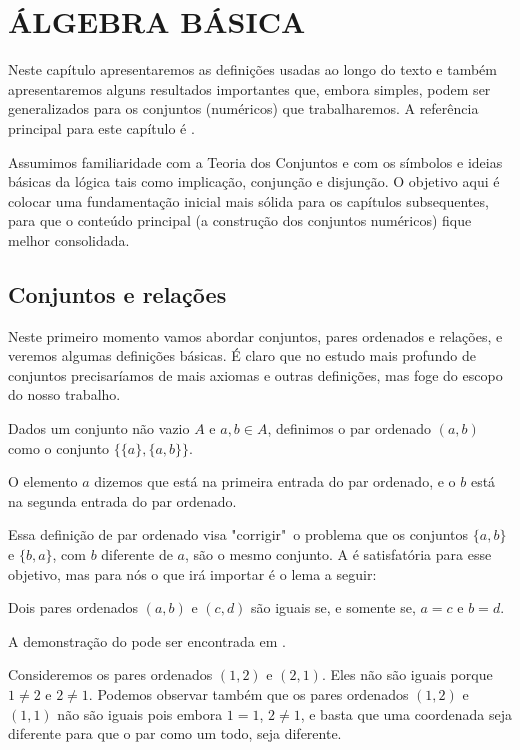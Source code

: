 \documentclass[../main.tex]{subfiles}
\begin{document}
\chapter{ÁLGEBRA BÁSICA}

Neste capítulo apresentaremos as definições usadas ao longo do texto e também apresentaremos alguns resultados importantes que, embora simples, podem ser generalizados para os conjuntos (numéricos) que trabalharemos. A referência principal para este capítulo é \textcite{domingues-iezzi-2018}.

Assumimos familiaridade com a Teoria dos Conjuntos e com os símbolos e ideias básicas da lógica tais como implicação, conjunção e disjunção. O objetivo aqui é colocar uma fundamentação inicial mais sólida para os capítulos subsequentes, para que o conteúdo principal (a construção dos conjuntos numéricos) fique melhor consolidada. 

\section{Conjuntos e relações}
Neste primeiro momento vamos abordar conjuntos, pares ordenados e relações, e veremos algumas definições básicas. É claro que no estudo mais profundo de conjuntos precisaríamos de mais axiomas e outras definições, mas foge do escopo do nosso trabalho.

\begin{defi}\label{agb-def-parOrdenado}
     Dados um conjunto não vazio $A$ e $a,b \in A$, definimos o par ordenado $(a,b)$ como o conjunto $\{\{a\}, \{a,b\}\}$.
\end{defi}
    O elemento $a$ dizemos que está na primeira entrada do par ordenado, e o $b$ está na segunda entrada do par ordenado.
    
    Essa definição de par ordenado visa "corrigir"\ o problema que os conjuntos $\{a,b\}$ e $\{b,a\}$, com $b$ diferente de $a$, são o mesmo conjunto.
    A  é satisfatória para esse objetivo, mas para nós o que irá importar é o lema a seguir:

\begin{lema}\label{agb-lema-parOrdenado}
    Dois pares ordenados $(a,b)$ e $(c,d)$ são iguais se, e somente se, $a=c$ e $b=d$.
\end{lema}
A demonstração do  pode ser encontrada em \textcite[p. 42]{suppes}.

\begin{ex}
    Consideremos os pares ordenados $(1,2)$ e $(2,1)$. Eles não são iguais porque $1 \neq 2$ e $2 \neq 1$. Podemos observar também que os pares ordenados $(1,2)$ e $(1,1)$ não são iguais pois embora $1=1$, $2 \neq 1$, e basta que uma coordenada seja diferente para que o par como um todo, seja diferente.
\end{ex}
\end{document}
